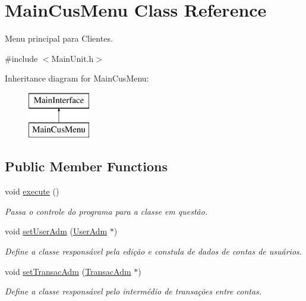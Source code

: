 \hypertarget{classMainCusMenu}{\section{Main\-Cus\-Menu Class Reference}
\label{dc/d35/classMainCusMenu}
}


Menu principal para Clientes.  




{\ttfamily \#include $<$Main\-Unit.\-h$>$}

Inheritance diagram for Main\-Cus\-Menu\-:\begin{figure}[H]
\begin{center}
\leavevmode
\includegraphics[height=2.000000cm]{dc/d35/classMainCusMenu}
\end{center}
\end{figure}
\subsection*{Public Member Functions}
\begin{DoxyCompactItemize}
\item 
void \hyperlink{classMainCusMenu_a91a3ffa75a1deb30dfc6eb604f1a1a2d}{execute} ()
\begin{DoxyCompactList}\small\item\em Passa o controle do programa para a classe em questão. \end{DoxyCompactList}\item 
void \hyperlink{classMainCusMenu_af2981981d6c17b53c4196f2febb373c2}{set\-User\-Adm} (\hyperlink{classUserAdm}{User\-Adm} $\ast$)
\begin{DoxyCompactList}\small\item\em Define a classe responsável pela edição e constula de dados de contas de usuários. \end{DoxyCompactList}\item 
void \hyperlink{classMainCusMenu_aa338655efeeb61c43a8089c5577ce47b}{set\-Transac\-Adm} (\hyperlink{classTransacAdm}{Transac\-Adm} $\ast$)
\begin{DoxyCompactList}\small\item\em Define a classe responsável pelo intermédio de transações entre contas. \end{DoxyCompactList}\end{DoxyCompactItemize}


